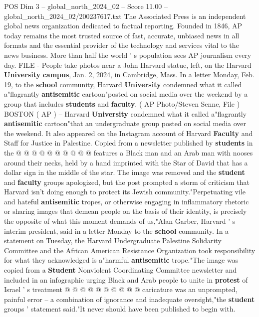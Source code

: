 \begin{textsample}{POS Dim 3 – global\_north\_2024\_02 – Score 11.00 – global\_north\_2024\_02/200237617.txt}  \label{ex:f3_pos_257}
The Associated Press is an independent global news organization dedicated to factual reporting.
Founded in 1846, AP today remains the most trusted source of fast, accurate, unbiased news in all formats and the essential provider of the technology and services vital to the news business.
More than half the world ' s population sees AP journalism every day.
FILE - People take photos near a John Harvard statue, left, on the Harvard \textbf{University} \textbf{campus}, Jan. 2, 2024, in Cambridge, Mass.
In a letter Monday, Feb. 19, to the \textbf{school} community, Harvard \textbf{University} condemned what it called a"flagrantly \textbf{antisemitic} cartoon"posted on social media over the weekend by a group that includes \textbf{students} and \textbf{faculty}. ( AP Photo/Steven Senne, File ) BOSTON ( AP ) -- Harvard \textbf{University} condemned what it called a"flagrantly \textbf{antisemitic} cartoon"that an undergraduate group posted on social media over the weekend.
It also appeared on the Instagram account of Harvard \textbf{Faculty} and Staff for Justice in Palestine.
Copied from a newsletter published by \textbf{students} in the @ @ @ @ @ @ @ @ @ @ features a Black man and an Arab man with nooses around their necks, held by a hand imprinted with the Star of David that has a dollar sign in the middle of the star.
The image was removed and the \textbf{student} and \textbf{faculty} groups apologized, but the post prompted a storm of criticism that Harvard isn't doing enough to protect its Jewish community."Perpetuating vile and hateful \textbf{antisemitic} tropes, or otherwise engaging in inflammatory rhetoric or sharing images that demean people on the basis of their identity, is precisely the opposite of what this moment demands of us,"Alan Garber, Harvard ' s interim president, said in a letter Monday to the \textbf{school} community.
In a statement on Tuesday, the Harvard Undergraduate Palestine Solidarity Committee and the African American Resistance Organization took responsibility for what they acknowledged is a"harmful \textbf{antisemitic} trope."The image was copied from a \textbf{Student} Nonviolent Coordinating Committee newsletter and included in an infographic urging Black and Arab people to unite in \textbf{protest} of Israel ' s treatment @ @ @ @ @ @ @ @ @ @ caricature was an unprompted, painful error -- a combination of ignorance and inadequate oversight,"the \textbf{student} groups ' statement said."It never should have been published to begin with.

\end{textsample}
